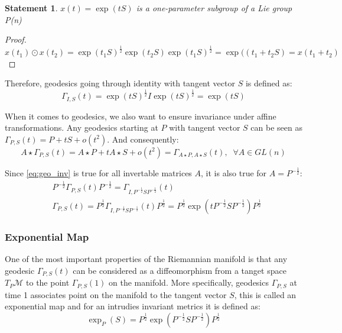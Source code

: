 \documentclass[12pt]{extarticle}
\newtheorem{statement}{Statement}[section]
\theoremstyle{definition}
\theoremstyle{remark}
\begin{document}
	\begin{statement}
		$x(t) = \exp(tS)$ is a one-parameter subgroup of a Lie group P(n)
	\end{statement}
	\begin{proof}
		$x(t_1)  \odot x(t_2) = \exp(t_1S)^{\frac12}\exp(t_2S)\exp(t_1S)^{\frac12} = \exp((t_1 + t_2S) = x(t_1 + t_2)$
	\end{proof}
	
	Therefore, geodesics going through identity with tangent vector $S$ is defined as:
	\begin{equation}\label{eq:geo_id}
	\Gamma_{I,S}(t) = \exp(tS)^{\frac12} I  \exp(tS)^{\frac12} =  \exp(tS)
	\end{equation}
	
	When it comes to geodesics, we also want to ensure invariance under affine transformations. Any geodesics starting at $P$ with tangent vector $S$ can be seen as $\Gamma_{P,S}(t) = P + tS + o(t^2)$. And consequently:
	\begin{equation}\label{eq:geo_inv}
	A\star \Gamma_{P,S}(t) = A\star P  + t A \star S + o(t^2) = \Gamma_{A\star P,A \star  S}(t), \;\; \forall A \in GL(n)
	\end{equation}
	
	Since \cref{eq:geo_inv} is true for all invertable matrices $A$, it is also true for $A = P^{-\frac12}$:
	\begin{align*}
	& P^{-\frac12} \Gamma_{P,S}(t) P^{-\frac12} = \Gamma_{I, P^{-\frac12}SP^{-\frac12}}(t)\\
	&\Gamma_{P,S}(t)  =  P^{\frac12}  \Gamma_{I, P^{-\frac12}SP^{-\frac12}}(t)  P^{\frac12} =  P^{\frac12}  \exp (t P^{-\frac12}SP^{-\frac12}) P^{\frac12}
	\end{align*}
	
	\subsubsection*{Exponential Map}
	One of the most important properties of the Riemannian manifold is that any geodesic $\Gamma_{P,S}(t)$ can be considered as a diffeomorphism from a tanget space $T_P\mathcal{M}$ to the point $\Gamma_{P,S}(1)$ on the manifold. More specifically, geodesics $\Gamma_{P,S}$  at time 1 associates point on the manifold to the tangent vector $S$, this is called an exponential map and for an intrudies invariant metrics it is defined as:
	\begin{equation*}
	\exp_P(S) = P^{\frac12}  \exp (P^{-\frac12}SP^{-\frac12}) P^{\frac12}
	\end{equation*}
	
\end{document}
